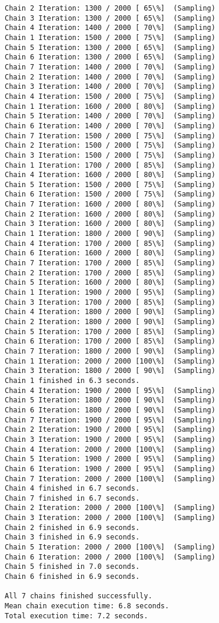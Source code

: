 \documentclass[11pt]{article}
\begin{document}
\begin{Verbatim}[commandchars=\\\{\}]
Chain 2 Iteration: 1300 / 2000 [ 65\%]  (Sampling)
Chain 3 Iteration: 1300 / 2000 [ 65\%]  (Sampling)
Chain 4 Iteration: 1400 / 2000 [ 70\%]  (Sampling)
Chain 1 Iteration: 1500 / 2000 [ 75\%]  (Sampling)
Chain 5 Iteration: 1300 / 2000 [ 65\%]  (Sampling)
Chain 6 Iteration: 1300 / 2000 [ 65\%]  (Sampling)
Chain 7 Iteration: 1400 / 2000 [ 70\%]  (Sampling)
Chain 2 Iteration: 1400 / 2000 [ 70\%]  (Sampling)
Chain 3 Iteration: 1400 / 2000 [ 70\%]  (Sampling)
Chain 4 Iteration: 1500 / 2000 [ 75\%]  (Sampling)
Chain 1 Iteration: 1600 / 2000 [ 80\%]  (Sampling)
Chain 5 Iteration: 1400 / 2000 [ 70\%]  (Sampling)
Chain 6 Iteration: 1400 / 2000 [ 70\%]  (Sampling)
Chain 7 Iteration: 1500 / 2000 [ 75\%]  (Sampling)
Chain 2 Iteration: 1500 / 2000 [ 75\%]  (Sampling)
Chain 3 Iteration: 1500 / 2000 [ 75\%]  (Sampling)
Chain 1 Iteration: 1700 / 2000 [ 85\%]  (Sampling)
Chain 4 Iteration: 1600 / 2000 [ 80\%]  (Sampling)
Chain 5 Iteration: 1500 / 2000 [ 75\%]  (Sampling)
Chain 6 Iteration: 1500 / 2000 [ 75\%]  (Sampling)
Chain 7 Iteration: 1600 / 2000 [ 80\%]  (Sampling)
Chain 2 Iteration: 1600 / 2000 [ 80\%]  (Sampling)
Chain 3 Iteration: 1600 / 2000 [ 80\%]  (Sampling)
Chain 1 Iteration: 1800 / 2000 [ 90\%]  (Sampling)
Chain 4 Iteration: 1700 / 2000 [ 85\%]  (Sampling)
Chain 6 Iteration: 1600 / 2000 [ 80\%]  (Sampling)
Chain 7 Iteration: 1700 / 2000 [ 85\%]  (Sampling)
Chain 2 Iteration: 1700 / 2000 [ 85\%]  (Sampling)
Chain 5 Iteration: 1600 / 2000 [ 80\%]  (Sampling)
Chain 1 Iteration: 1900 / 2000 [ 95\%]  (Sampling)
Chain 3 Iteration: 1700 / 2000 [ 85\%]  (Sampling)
Chain 4 Iteration: 1800 / 2000 [ 90\%]  (Sampling)
Chain 2 Iteration: 1800 / 2000 [ 90\%]  (Sampling)
Chain 5 Iteration: 1700 / 2000 [ 85\%]  (Sampling)
Chain 6 Iteration: 1700 / 2000 [ 85\%]  (Sampling)
Chain 7 Iteration: 1800 / 2000 [ 90\%]  (Sampling)
Chain 1 Iteration: 2000 / 2000 [100\%]  (Sampling)
Chain 3 Iteration: 1800 / 2000 [ 90\%]  (Sampling)
Chain 1 finished in 6.3 seconds.
Chain 4 Iteration: 1900 / 2000 [ 95\%]  (Sampling)
Chain 5 Iteration: 1800 / 2000 [ 90\%]  (Sampling)
Chain 6 Iteration: 1800 / 2000 [ 90\%]  (Sampling)
Chain 7 Iteration: 1900 / 2000 [ 95\%]  (Sampling)
Chain 2 Iteration: 1900 / 2000 [ 95\%]  (Sampling)
Chain 3 Iteration: 1900 / 2000 [ 95\%]  (Sampling)
Chain 4 Iteration: 2000 / 2000 [100\%]  (Sampling)
Chain 5 Iteration: 1900 / 2000 [ 95\%]  (Sampling)
Chain 6 Iteration: 1900 / 2000 [ 95\%]  (Sampling)
Chain 7 Iteration: 2000 / 2000 [100\%]  (Sampling)
Chain 4 finished in 6.7 seconds.
Chain 7 finished in 6.7 seconds.
Chain 2 Iteration: 2000 / 2000 [100\%]  (Sampling)
Chain 3 Iteration: 2000 / 2000 [100\%]  (Sampling)
Chain 2 finished in 6.9 seconds.
Chain 3 finished in 6.9 seconds.
Chain 5 Iteration: 2000 / 2000 [100\%]  (Sampling)
Chain 6 Iteration: 2000 / 2000 [100\%]  (Sampling)
Chain 5 finished in 7.0 seconds.
Chain 6 finished in 6.9 seconds.

All 7 chains finished successfully.
Mean chain execution time: 6.8 seconds.
Total execution time: 7.2 seconds.

    \end{Verbatim}
\end{document}
